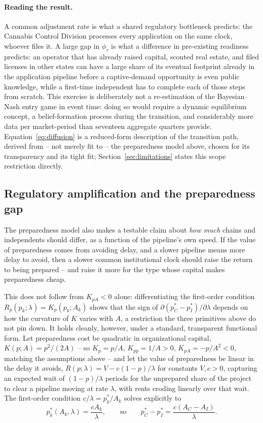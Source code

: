 \documentclass[english,12pt]{article}
\begin{document}
\paragraph{Reading the result.} A common adjustment rate is what a shared regulatory bottleneck predicts: the Cannabis Control Division processes every application on the same clock, whoever files it. A large gap in $\phi_\tau$ is what a difference in pre-existing readiness predicts: an operator that has already raised capital, scouted real estate, and filed licenses in other states can have a large share of its eventual footprint already in the application pipeline before a captive-demand opportunity is even public knowledge, while a first-time independent has to complete each of those steps from scratch. This exercise is deliberately not a re-estimation of the Bayesian--Nash entry game in event time: doing so would require a dynamic equilibrium concept, a belief-formation process during the transition, and considerably more data per market-period than seventeen aggregate quarters provide. Equation~\eqref{eq:diffusion} is a reduced-form description of the transition path, derived from -- not merely fit to -- the preparedness model above, chosen for its transparency and its tight fit; Section~\ref{sec:limitations} states this scope restriction directly.

\subsection{Regulatory amplification and the preparedness gap}
\label{sec:amplification}

The preparedness model also makes a testable claim about \emph{how much} chains and independents should differ, as a function of the pipeline's own speed. If the value of preparedness comes from avoiding delay, and a slower pipeline means more delay to avoid, then a slower common institutional clock should raise the return to being prepared -- and raise it more for the type whose capital makes preparedness cheap.

This does not follow from $K_{pA}<0$ alone: differentiating the first-order condition $R_p(p_k;\lambda)=K_p(p_k;A_k)$ shows that the sign of $\partial(p_C^*-p_I^*)/\partial\lambda$ depends on how the curvature of $K$ varies with $A$, a restriction the three primitives above do not pin down. It holds cleanly, however, under a standard, transparent functional form. Let preparedness cost be quadratic in organizational capital, $K(p;A)=p^2/(2A)$ -- so $K_p=p/A$, $K_{pp}=1/A>0$, $K_{pA}=-p/A^2<0$, matching the assumptions above -- and let the value of preparedness be linear in the delay it avoids, $R(p;\lambda)=V-c(1-p)/\lambda$ for constants $V,c>0$, capturing an expected wait of $(1-p)/\lambda$ periods for the unprepared share of the project to clear a pipeline moving at rate $\lambda$, with rents eroding linearly over that wait. The first-order condition $c/\lambda = p_k^*/A_k$ solves explicitly to
\[
p_k^*(A_k,\lambda) = \frac{cA_k}{\lambda}, \qquad\text{so}\qquad p_C^*-p_I^* = \frac{c(A_C-A_I)}{\lambda}.
\]
\end{document}
